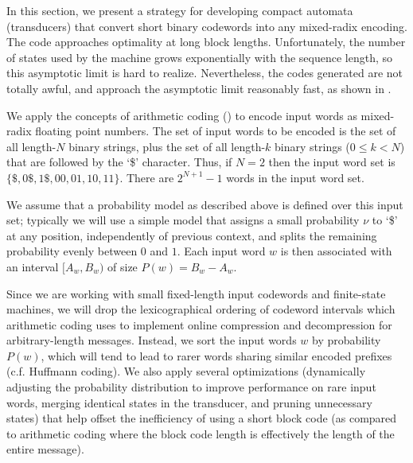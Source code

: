 \documentclass[english]{article}
\begin{document}
In this section, we present a strategy for developing compact automata (transducers) that convert short binary codewords into any mixed-radix encoding.
The code approaches optimality at long block lengths.
Unfortunately, the number of states used by the machine grows exponentially with the sequence length, so this asymptotic limit is hard to realize.
Nevertheless, the codes generated are not totally awful, and approach the asymptotic limit reasonably fast,
as shown in .

We apply the concepts of arithmetic coding () to encode input words as mixed-radix floating point numbers.
The set of input words to be encoded is the set of all length-$N$ binary strings,
plus the set of all length-$k$ binary strings ($0 \leq k < N$) that are followed by the `\$' character.
Thus, if $N=2$ then the input word set is $\{\$,0\$,1\$,00,01,10,11\}$.
There are $2^{N+1}-1$ words in the input word set.

We assume that a probability model as described above is defined over this input set;
typically we will use a simple model that assigns a small probability $\nu$ to `\$' at any position,
independently of previous context,
and splits the remaining probability evenly between $0$ and $1$.
Each input word $w$ is then associated with an interval $[A_w,B_w)$ of size $P(w) = B_w-A_w$.

Since we are working with small fixed-length input codewords and finite-state machines, we will drop the lexicographical ordering of codeword intervals
which arithmetic coding uses to implement online compression and decompression for arbitrary-length messages.
Instead, we sort the input words $w$ by probability $P(w)$, which will tend to lead to rarer words sharing similar encoded prefixes
(c.f. Huffmann coding).
We also apply several optimizations (dynamically adjusting the probability distribution to improve performance on rare input words,
merging identical states in the transducer, and pruning unnecessary states) that help offset the inefficiency of using a short block code
(as compared to arithmetic coding where the block code length is effectively the length of the entire message).
\end{document}
